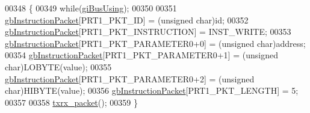 \begin{DoxyCode}
00348 \{
00349     \textcolor{keywordflow}{while}(\hyperlink{a00003_ad10e0e49f5fef04bf789a89c14cc470a}{giBusUsing});
00350 
00351     \hyperlink{a00003_afd94dcf01b8e96298727776e222de722}{gbInstructionPacket}[PRT1\_PKT\_ID] = (\textcolor{keywordtype}{unsigned} char)\textcolor{keywordtype}{id};
00352     \hyperlink{a00003_afd94dcf01b8e96298727776e222de722}{gbInstructionPacket}[PRT1\_PKT\_INSTRUCTION] = INST\_WRITE;
00353     \hyperlink{a00003_afd94dcf01b8e96298727776e222de722}{gbInstructionPacket}[PRT1\_PKT\_PARAMETER0+0] = (\textcolor{keywordtype}{unsigned} char)address;
00354     \hyperlink{a00003_afd94dcf01b8e96298727776e222de722}{gbInstructionPacket}[PRT1\_PKT\_PARAMETER0+1] = (\textcolor{keywordtype}{unsigned} char)LOBYTE(value);
00355     \hyperlink{a00003_afd94dcf01b8e96298727776e222de722}{gbInstructionPacket}[PRT1\_PKT\_PARAMETER0+2] = (\textcolor{keywordtype}{unsigned} char)HIBYTE(value);
00356     \hyperlink{a00003_afd94dcf01b8e96298727776e222de722}{gbInstructionPacket}[PRT1\_PKT\_LENGTH] = 5;
00357     
00358     \hyperlink{a00003_aebfc569c6b1eb0b98f8c385f0f921fc0}{txrx\_packet}();
00359 \}
\end{DoxyCode}
